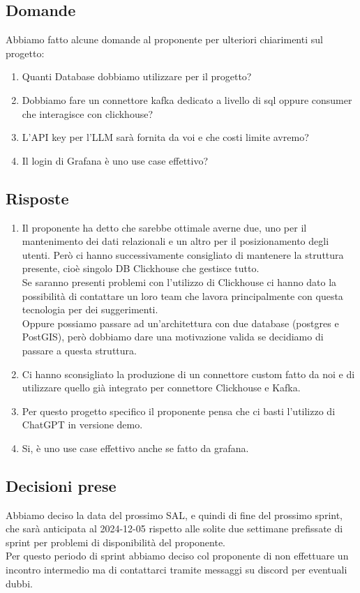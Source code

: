 \documentclass[12pt]{article}
\begin{document}
\subsection{Domande}
Abbiamo fatto alcune domande al proponente per ulteriori chiarimenti sul progetto:\\
\begin{enumerate}
\item Quanti Database dobbiamo utilizzare per il progetto?
\item Dobbiamo fare un connettore kafka dedicato a livello di sql oppure consumer che interagisce con clickhouse?
\item L'API key per l'LLM sarà fornita da voi e che costi limite avremo?
\item Il login di Grafana è uno use case effettivo?
\end{enumerate}
\subsection{Risposte}
\begin{enumerate}
\item Il proponente ha detto che sarebbe ottimale averne due, uno per il mantenimento dei dati relazionali e un altro per il posizionamento degli utenti. Però ci hanno successivamente consigliato di mantenere la struttura presente, cioè singolo DB Clickhouse che gestisce tutto. \\
Se saranno presenti problemi con l'utilizzo di Clickhouse ci hanno dato la possibilità di contattare un loro team che lavora principalmente con questa tecnologia per dei suggerimenti.\\
Oppure possiamo passare ad un'architettura con due database (postgres e PostGIS), però dobbiamo dare una motivazione valida se decidiamo di passare a questa struttura.
\item Ci hanno sconsigliato la produzione di un connettore custom fatto da noi e di utilizzare quello già integrato per connettore Clickhouse e Kafka.
\item Per questo progetto specifico il proponente pensa che ci basti l'utilizzo di ChatGPT in versione demo.
\item Si, è uno use case effettivo anche se fatto da grafana.
\end{enumerate}

\subsection{Decisioni prese}
Abbiamo deciso la data del prossimo SAL, e quindi di fine del prossimo sprint, che sarà anticipata al 2024-12-05 rispetto alle solite due settimane prefissate di sprint per problemi di disponibilità del proponente.\\
Per questo periodo di sprint abbiamo deciso col proponente di non effettuare un incontro intermedio ma di contattarci tramite messaggi su discord per eventuali dubbi. 
\end{document}
